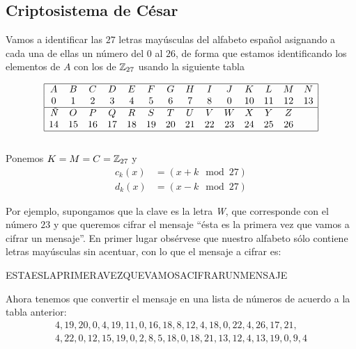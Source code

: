 \subsection*{Criptosistema de César}

Vamos a identificar las $27$ letras mayúsculas del alfabeto español asignando a cada una de ellas un número del $0$ al $26$, de forma que estamos identificando los elementos de $A$ con los de $\mathbb{Z}_{27}$ usando la siguiente tabla

\begin{equation}
    \begin{array}{|cccccccccccccc|}\hline
        A & B & C & D & E & F & G & H & I & J & K  & L  & M  & N \\
        0 & 1 & 2 & 3 & 4 & 5 & 6 & 7 & 8 & 0 & 10 & 11 & 12 & 13 \\ \hline
        \text{\it Ñ} & O  & P  & Q  & R  & S  & T  & U  & V  & W  & X  & Y  & Z & \\
                  14 & 15 & 16 & 17 & 18 & 19 & 20 & 21 & 22 & 23 & 24 & 25 & 26 & \\ \hline
    \end{array}
\end{equation}
\\
Ponemos $K=M=C=\mathbb{Z}_{27}$ y 
\begin{equation*}
    \begin{split}
        c_k(x) &= ( x + k \mod 27 ) \\
        d_k(x) &= ( x - k \mod 27 )
    \end{split}
\end{equation*}

Por ejemplo, supongamos que la clave es la letra \textit{W}, que corresponde con el número $23$ y que queremos cifrar el mensaje ``ésta es la primera vez que vamos a cifrar un mensaje''. En primer lugar obsérvese que nuestro alfabeto sólo contiene letras mayúsculas sin acentuar, con lo que el mensaje a cifrar es:

\begin{center}
    ESTAESLAPRIMERAVEZQUEVAMOSACIFRARUNMENSAJE
\end{center}

Ahora tenemos que convertir el mensaje en una lista de números de acuerdo a la tabla anterior:
\begin{gather*}
    4, 19, 20, 0, 4, 19, 11, 0, 16, 18, 8, 12, 4, 18, 0, 22, 4, 26, 17, 21, \\ 4, 22, 0, 12, 15, 19, 0, 2, 8, 5, 18, 0, 18, 21, 13, 12, 4, 13, 19, 0, 9, 4
\end{gather*}

